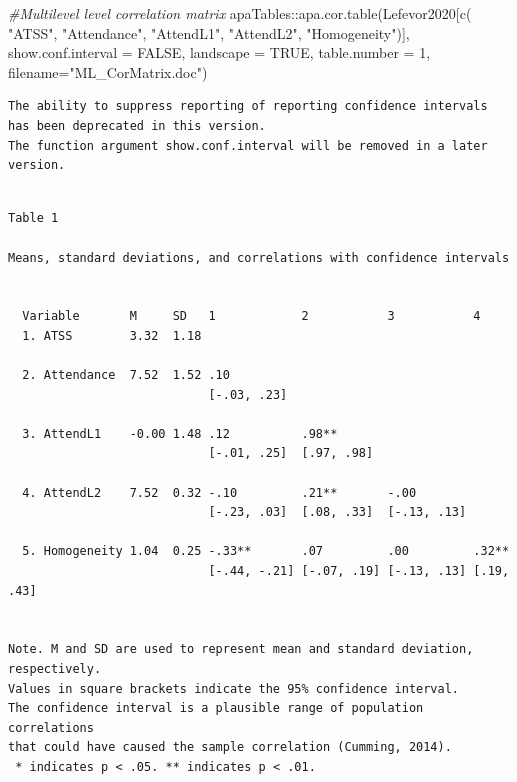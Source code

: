 \documentclass[
  english,
]{book}
\newenvironment{Shaded}{\begin{snugshade}}{\end{snugshade}}
\newcommand{\AttributeTok}[1]{\textcolor[rgb]{0.77,0.63,0.00}{#1}}
\newcommand{\CommentTok}[1]{\textcolor[rgb]{0.56,0.35,0.01}{\textit{#1}}}
\newcommand{\ConstantTok}[1]{\textcolor[rgb]{0.00,0.00,0.00}{#1}}
\newcommand{\DecValTok}[1]{\textcolor[rgb]{0.00,0.00,0.81}{#1}}
\newcommand{\FunctionTok}[1]{\textcolor[rgb]{0.00,0.00,0.00}{#1}}
\newcommand{\NormalTok}[1]{#1}
\newcommand{\SpecialCharTok}[1]{\textcolor[rgb]{0.00,0.00,0.00}{#1}}
\newcommand{\StringTok}[1]{\textcolor[rgb]{0.31,0.60,0.02}{#1}}
\begin{document}
\begin{Shaded}
\begin{Highlighting}[]
\CommentTok{\#Multilevel level correlation matrix}
\NormalTok{apaTables}\SpecialCharTok{::}\FunctionTok{apa.cor.table}\NormalTok{(Lefevor2020[}\FunctionTok{c}\NormalTok{(}
\StringTok{"ATSS"}\NormalTok{, }\StringTok{"Attendance"}\NormalTok{, }\StringTok{"AttendL1"}\NormalTok{, }\StringTok{"AttendL2"}\NormalTok{, }\StringTok{"Homogeneity"}\NormalTok{)], }\AttributeTok{show.conf.interval =} \ConstantTok{FALSE}\NormalTok{, }\AttributeTok{landscape =} \ConstantTok{TRUE}\NormalTok{, }\AttributeTok{table.number =} \DecValTok{1}\NormalTok{, }\AttributeTok{filename=}\StringTok{"ML\_CorMatrix.doc"}\NormalTok{)}
\end{Highlighting}
\end{Shaded}

\begin{verbatim}
The ability to suppress reporting of reporting confidence intervals has been deprecated in this version.
The function argument show.conf.interval will be removed in a later version.
\end{verbatim}

\begin{verbatim}

Table 1 

Means, standard deviations, and correlations with confidence intervals
 

  Variable       M     SD   1            2           3           4         
  1. ATSS        3.32  1.18                                                
                                                                           
  2. Attendance  7.52  1.52 .10                                            
                            [-.03, .23]                                    
                                                                           
  3. AttendL1    -0.00 1.48 .12          .98**                             
                            [-.01, .25]  [.97, .98]                        
                                                                           
  4. AttendL2    7.52  0.32 -.10         .21**       -.00                  
                            [-.23, .03]  [.08, .33]  [-.13, .13]           
                                                                           
  5. Homogeneity 1.04  0.25 -.33**       .07         .00         .32**     
                            [-.44, -.21] [-.07, .19] [-.13, .13] [.19, .43]
                                                                           

Note. M and SD are used to represent mean and standard deviation, respectively.
Values in square brackets indicate the 95% confidence interval.
The confidence interval is a plausible range of population correlations 
that could have caused the sample correlation (Cumming, 2014).
 * indicates p < .05. ** indicates p < .01.
 
\end{verbatim}
\end{document}
